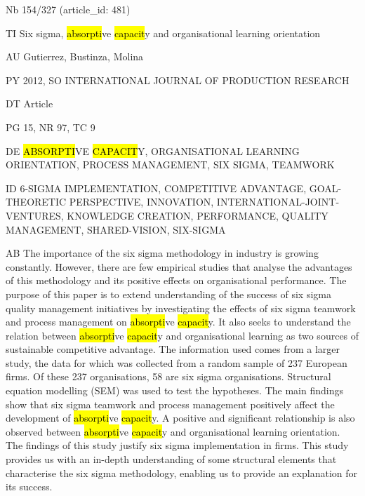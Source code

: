 \documentclass[a4paper]{article}
\begin{document}
\vspace*{-2cm}
Nb \tabto{0cm}154/327 (article\_id: 481)\par
TI \tabto{0cm}Six sigma, \hl{absorpti}ve \hl{capacit}y and organisational learning orientation\par
AU \tabto{0cm}Gutierrez, Bustinza, Molina\par
PY \tabto{0cm}2012, SO INTERNATIONAL JOURNAL OF PRODUCTION RESEARCH\par
DT \tabto{0cm}Article\par
PG \tabto{0cm}15, NR 97, TC 9\par
DE \tabto{0cm}\hl{ABSORPTI}VE \hl{CAPACIT}Y, ORGANISATIONAL LEARNING ORIENTATION, PROCESS MANAGEMENT, SIX SIGMA, TEAMWORK\par
ID \tabto{0cm}6-SIGMA IMPLEMENTATION, COMPETITIVE ADVANTAGE, GOAL-THEORETIC PERSPECTIVE, INNOVATION, INTERNATIONAL-JOINT-VENTURES, KNOWLEDGE CREATION, PERFORMANCE, QUALITY MANAGEMENT, SHARED-VISION, SIX-SIGMA\par
AB \tabto{0cm}The importance of the six sigma methodology in industry is growing constantly. However, there are few empirical studies that analyse the advantages of this methodology and its positive effects on organisational performance. The purpose of this paper is to extend understanding of the success of six sigma quality management initiatives by investigating the effects of six sigma teamwork and process management on \hl{absorpti}ve \hl{capacit}y. It also seeks to understand the relation between \hl{absorpti}ve \hl{capacit}y and organisational learning as two sources of sustainable competitive advantage. The information used comes from a larger study, the data for which was collected from a random sample of 237 European firms. Of these 237 organisations, 58 are six sigma organisations. Structural equation modelling (SEM) was used to test the hypotheses. The main findings show that six sigma teamwork and process management positively affect the development of \hl{absorpti}ve \hl{capacit}y. A positive and significant relationship is also observed between \hl{absorpti}ve \hl{capacit}y and organisational learning orientation. The findings of this study justify six sigma implementation in firms. This study provides us with an in-depth understanding of some structural elements that characterise the six sigma methodology, enabling us to provide an explanation for its success.\par
\clearpage
\end{document}
